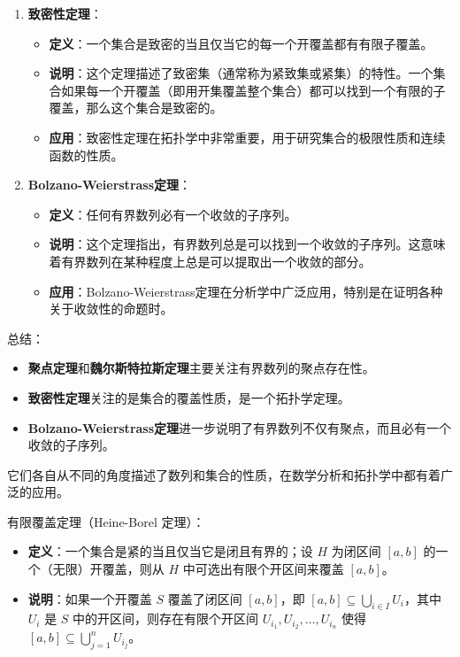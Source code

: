 \documentclass[lang=cn,newtx,10pt,scheme=chinese]{elegantbook}
\begin{document}
\begin{change}
\begin{enumerate}
  \item \textbf{致密性定理}：
    \begin{itemize}
      \item \textbf{定义}：一个集合是致密的当且仅当它的每一个开覆盖都有有限子覆盖。
      \item \textbf{说明}：这个定理描述了致密集（通常称为紧致集或紧集）的特性。一个集合如果每一个开覆盖（即用开集覆盖整个集合）都可以找到一个有限的子覆盖，那么这个集合是致密的。
      \item \textbf{应用}：致密性定理在拓扑学中非常重要，用于研究集合的极限性质和连续函数的性质。
    \end{itemize}
    
  \item \textbf{Bolzano-Weierstrass定理}：
    \begin{itemize}
      \item \textbf{定义}：任何有界数列必有一个收敛的子序列。
      \item \textbf{说明}：这个定理指出，有界数列总是可以找到一个收敛的子序列。这意味着有界数列在某种程度上总是可以提取出一个收敛的部分。
      \item \textbf{应用}：Bolzano-Weierstrass定理在分析学中广泛应用，特别是在证明各种关于收敛性的命题时。
    \end{itemize}
\end{enumerate}

总结：
\begin{itemize}
  \item \textbf{聚点定理}和\textbf{魏尔斯特拉斯定理}主要关注有界数列的聚点存在性。
  \item \textbf{致密性定理}关注的是集合的覆盖性质，是一个拓扑学定理。
  \item \textbf{Bolzano-Weierstrass定理}进一步说明了有界数列不仅有聚点，而且必有一个收敛的子序列。
\end{itemize}

它们各自从不同的角度描述了数列和集合的性质，在数学分析和拓扑学中都有着广泛的应用。

  \item 有限覆盖定理（Heine-Borel 定理）：
    \begin{itemize}
      \item \textbf{定义}：一个集合是紧的当且仅当它是闭且有界的；设 $H$ 为闭区间 $[a,b]$ 的一个（无限）开覆盖，则从 $H$ 中可选出有限个开区间来覆盖 $[a,b]$。
      \item \textbf{说明}：如果一个开覆盖 \( S \) 覆盖了闭区间 \([a, b]\)，即 \([a, b] \subseteq \bigcup_{i \in I} U_i\)，其中 \( U_i \) 是 \( S \) 中的开区间，则存在有限个开区间 \( U_{i_1}, U_{i_2}, \ldots, U_{i_n} \) 使得 \([a, b] \subseteq \bigcup_{j=1}^n U_{i_j}\)。
    \end{itemize}

\end{change}
\end{document}
